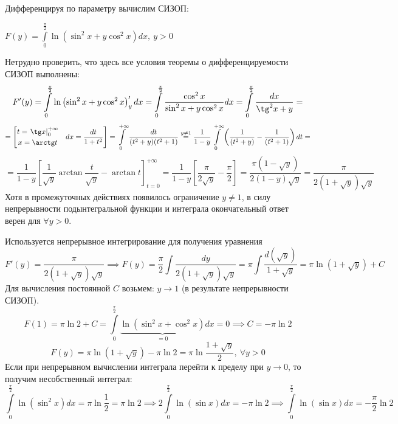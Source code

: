 \documentclass[../../main.tex]{subfiles}
\begin{document}
\begin{example}
    Дифференцируя по параметру вычислим СИЗОП:

    $F(y) = \int\limits_0^{\frac{\pi}{2}} \ln
    \left( \sin^2 x + y \cos^2 x \right) dx, \ y > 0$

    Нетрудно проверить, что здесь все условия теоремы о дифференцируемости 
    СИЗОП
    выполнены:
    \[ F'(y) = \int\limits_0^{\frac{\pi}{2}} \ln
    \left( \sin^2 x + y \cos^2 x \right)'_y dx = 
    \int\limits_0^{\frac{\pi}{2}} \dfrac{\cos^2 x}{\sin^2 x + y \cos^2 x} dx =
    \int\limits_0^{\frac{\pi}{2}} \dfrac{dx}{\tg^2 x  + y} = \]
    \[ = \left[
    \begin{gathered}
        t = \left. \tg x \right|_0^{+\infty} \\
        x = \arctan t
    \end{gathered} \ \ \
    dx = \dfrac{dt}{1 + t^2}
    \right] = \int\limits_0^{+\infty} \dfrac{dt}{(t^2 + y)(t^2 + 1)}
    \overset{y \neq 1}{=}
    \dfrac{1}{1-y} \int\limits_0^{+\infty} \left( \dfrac{1}{(t^2 + y)} -
    \dfrac{1}{(t^2 + 1)} \right) dt = \]
    \[ = \dfrac{1}{1 - y} \left[ \dfrac{1}{\sqrt{y}} \arctan 
    \dfrac{t}{\sqrt{y}}
    - \arctan t \right]_{t = 0}^{+\infty} = \dfrac{1}{1 - y}
    \left[ \dfrac{\pi}{2 \sqrt{y}}
    - \dfrac{\pi}{2} \right] = \dfrac{\pi (1 - \sqrt{y})}{2 (1 - y) \sqrt{y}} =
    \dfrac{\pi}{2 (1 + \sqrt{y}) \sqrt{y}} \]
    Хотя в промежуточных действиях появилось ограничение $y \neq 1$,
    в силу непрерывности
    подынтегральной функции и интеграла окончательный ответ верен для
    $\forall y > 0$.

    Используется непрерывное интегрирование для получения уравнения
    \[F'(y) = \dfrac{\pi}{2(1+\sqrt{y})\sqrt{y}} \implies F(y) =
    \dfrac{\pi}{2} \int \dfrac{dy}{2 (1 + \sqrt{y}) \sqrt{y}}  = \pi
    \int \dfrac{d(\sqrt{y})}{1 + \sqrt{y}} = \pi \ln (1 + \sqrt{y}) + C \]
    Для вычисления постоянной $C$ возьмем: $y \to 1$ (в результате
    непрерывности СИЗОП).
    \[F(1) = \pi \ln 2 + C = \int\limits_0^{\frac{\pi}{2}}
    \underbrace{ \ln \left( \sin^2 x + \cos^2 x \right)}_{= 0} dx = 0
    \implies C = -\pi \ln 2\]
    \[F(y) = \pi \ln(1 + \sqrt{y}) - \pi \ln 2 =
    \pi \ln \dfrac{1 + \sqrt{y}}{2}, \ \forall y > 0\]
    Если при непрерывном вычислении интеграла перейти к пределу при $y \to 0$,
    то получим несобственный интеграл:
    \[ \int\limits_0^{\frac{\pi}{2}} \ln (\sin^2 x)dx = \pi \ln \dfrac{1}{2} =
    \pi \ln 2 \implies 2 \int\limits_0^{\frac{\pi}{2}} \ln (\sin x) dx = 
    - \pi \ln 2 \implies \int\limits_0^{\frac{\pi}{2}} \ln (\sin x) dx = 
    - \dfrac{\pi}{2}\ln 2\]
    
\end{example}
\end{document}
